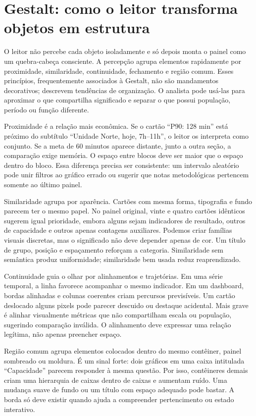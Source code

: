 \section{Gestalt: como o leitor transforma objetos em estrutura}

O leitor não percebe cada objeto isoladamente e só depois monta o painel como um quebra-cabeça consciente. A percepção agrupa elementos rapidamente por proximidade, similaridade, continuidade, fechamento e região comum. Esses princípios, frequentemente associados à Gestalt, não são mandamentos decorativos; descrevem tendências de organização. O analista pode usá-las para aproximar o que compartilha significado e separar o que possui população, período ou função diferente.

Proximidade é a relação mais econômica. Se o cartão ``P90: 128 min'' está próximo do subtítulo ``Unidade Norte, hoje, 7h--11h'', o leitor os interpreta como conjunto. Se a meta de 60 minutos aparece distante, junto a outra seção, a comparação exige memória. O espaço entre blocos deve ser maior que o espaço dentro do bloco. Essa diferença precisa ser consistente: um intervalo aleatório pode unir filtros ao gráfico errado ou sugerir que notas metodológicas pertencem somente ao último painel.

Similaridade agrupa por aparência. Cartões com mesma forma, tipografia e fundo parecem ter o mesmo papel. No painel original, vinte e quatro cartões idênticos sugerem igual prioridade, embora alguns sejam indicadores de resultado, outros de capacidade e outros apenas contagens auxiliares. Podemos criar famílias visuais discretas, mas o significado não deve depender apenas de cor. Um título de grupo, posição e espaçamento reforçam a categoria. Similaridade sem semântica produz uniformidade; similaridade bem usada reduz reaprendizado.

Continuidade guia o olhar por alinhamentos e trajetórias. Em uma série temporal, a linha favorece acompanhar o mesmo indicador. Em um dashboard, bordas alinhadas e colunas coerentes criam percursos previsíveis. Um cartão deslocado alguns pixels pode parecer descuido ou destaque acidental. Mais grave é alinhar visualmente métricas que não compartilham escala ou população, sugerindo comparação inválida. O alinhamento deve expressar uma relação legítima, não apenas preencher espaço.

Região comum agrupa elementos colocados dentro do mesmo contêiner, painel sombreado ou moldura. É um sinal forte: dois gráficos em uma caixa intitulada ``Capacidade'' parecem responder à mesma questão. Por isso, contêineres demais criam uma hierarquia de caixas dentro de caixas e aumentam ruído. Uma mudança suave de fundo ou um título com espaço adequado pode bastar. A borda só deve existir quando ajuda a compreender pertencimento ou estado interativo.

